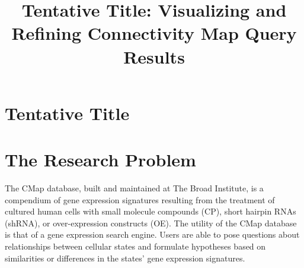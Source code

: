 \documentclass[12pt]{article}
\begin{document}
\section{Tentative Title}
\title{Tentative Title: Visualizing and Refining Connectivity Map Query Results}
\maketitle


\doublespacing

\section{The Research Problem}

The CMap database, built and maintained at The Broad Institute, is a compendium of gene expression signatures resulting from the treatment of cultured human cells with small molecule compounds (CP), short hairpin RNAs (shRNA), or over-expression constructs (OE). The utility of the CMap database is that of a gene expression search engine. Users are able to pose questions about relationships between cellular states and formulate hypotheses based on similarities or differences in the states' gene expression signatures.
\end{document}

